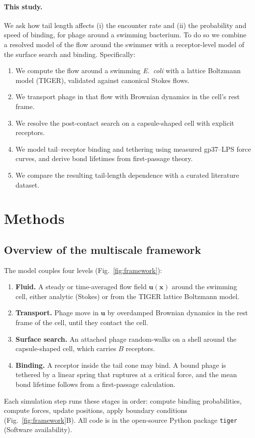 \documentclass[12pt]{article}
\begin{document}
\paragraph{This study.} We ask how tail length affects (i) the encounter rate and (ii) the probability and speed of binding, for phage around a swimming bacterium. To do so we combine a resolved model of the flow around the swimmer with a receptor-level model of the surface search and binding. Specifically:
\begin{enumerate}\setlength\itemsep{0pt}
\item We compute the flow around a swimming \textit{E.~coli} with a lattice Boltzmann model (TIGER), validated against canonical Stokes flows.
\item We transport phage in that flow with Brownian dynamics in the cell's rest frame.
\item We resolve the post-contact search on a capsule-shaped cell with explicit receptors.
\item We model tail--receptor binding and tethering using measured gp37--LPS force curves, and derive bond lifetimes from first-passage theory.
\item We compare the resulting tail-length dependence with a curated literature dataset.
\end{enumerate}

\section*{Methods}

\subsection*{Overview of the multiscale framework}
The model couples four levels (Fig.~\ref{fig:framework}):
\begin{enumerate}\setlength\itemsep{0pt}
\item \textbf{Fluid.} A steady or time-averaged flow field $\bm u(\bm x)$ around the swimming cell, either analytic (Stokes) or from the TIGER lattice Boltzmann model.
\item \textbf{Transport.} Phage move in $\bm u$ by overdamped Brownian dynamics in the rest frame of the cell, until they contact the cell.
\item \textbf{Surface search.} An attached phage random-walks on a shell around the capsule-shaped cell, which carries $B$ receptors.
\item \textbf{Binding.} A receptor inside the tail cone may bind. A bound phage is tethered by a linear spring that ruptures at a critical force, and the mean bond lifetime follows from a first-passage calculation.
\end{enumerate}
Each simulation step runs these stages in order: compute binding probabilities, compute forces, update positions, apply boundary conditions (Fig.~\ref{fig:framework}B). All code is in the open-source Python package \texttt{tiger} (Software availability).
\end{document}
